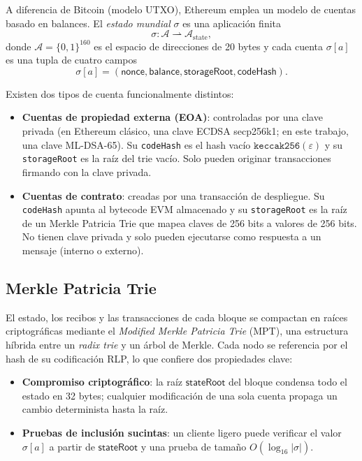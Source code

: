 A diferencia de Bitcoin \parencite{nakamoto2008bitcoin} (modelo UTXO), Ethereum emplea un modelo de cuentas basado en balances. El \emph{estado mundial} $\sigma$ es una aplicación finita
\begin{equation}
  \sigma : \mathcal{A} \rightharpoonup \mathcal{A}_{\text{state}},
\end{equation}
donde $\mathcal{A} = \{0,1\}^{160}$ es el espacio de direcciones de 20 bytes y cada cuenta $\sigma[a]$ es una tupla de cuatro campos
\begin{equation}
  \sigma[a] = (\textsf{nonce}, \textsf{balance}, \textsf{storageRoot}, \textsf{codeHash}).
  \label{eq:account}
\end{equation}

Existen dos tipos de cuenta funcionalmente distintos:

\begin{itemize}
  \item \textbf{Cuentas de propiedad externa (EOA)}: controladas por una clave privada (en Ethereum clásico, una clave ECDSA secp256k1; en este trabajo, una clave ML-DSA-65). Su \texttt{codeHash} es el hash vacío $\texttt{keccak256}(\varepsilon)$ y su \texttt{storageRoot} es la raíz del trie vacío. Solo pueden originar transacciones firmando con la clave privada.
  
  \item \textbf{Cuentas de contrato}: creadas por una transacción de despliegue. Su \texttt{codeHash} apunta al bytecode EVM almacenado y su \texttt{storageRoot} es la raíz de un Merkle Patricia Trie que mapea claves de 256 bits a valores de 256 bits. No tienen clave privada y solo pueden ejecutarse como respuesta a un mensaje (interno o externo).
\end{itemize}

\subsection{Merkle Patricia Trie}
\label{sec:mpt}

El estado, los recibos y las transacciones de cada bloque se compactan en raíces criptográficas mediante el \emph{Modified Merkle Patricia Trie} (MPT), una estructura híbrida entre un \emph{radix trie} y un árbol de Merkle. Cada nodo se referencia por el hash de su codificación RLP, lo que confiere dos propiedades clave:

\begin{itemize}
  \item \textbf{Compromiso criptográfico}: la raíz $\textsf{stateRoot}$ del bloque condensa todo el estado en 32 bytes; cualquier modificación de una sola cuenta propaga un cambio determinista hasta la raíz.
  \item \textbf{Pruebas de inclusión sucintas}: un cliente ligero puede verificar el valor $\sigma[a]$ a partir de $\textsf{stateRoot}$ y una prueba de tamaño $O(\log_{16} |\sigma|)$.
\end{itemize}

